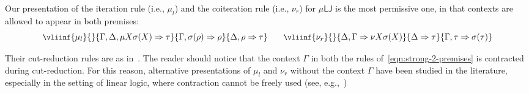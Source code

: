 \documentclass[10pt,a4paper]{amsart}
\theoremstyle{plain}
\theoremstyle{definition}
\newcommand{\dfn}{:=}
\theoremstyle{plain}
\theoremstyle{definition} %
\newcommand{\nat}{\mathit{N}}
\newcommand{\N}{\nat} %
\newcommand{\unit}{1}
\newcommand{\seqar}{\Rightarrow}
\newcommand{\lr}[1]{#1_l}
\newcommand{\rr}[1]{#1_r}
\newcommand{\LJ}{\mathsf{LJ}}
\newcommand{\muLJ}{\mu\LJ}
\newcommand{\circular}{\mathsf C}
\newcommand{\cmuLJ}{\circular\muLJ}
\begin{document}






Our presentation of the iteration rule (i.e., $\lr\mu$)  and the coiteration rule (i.e., $\rr \nu$) for $\muLJ$ is the most permissive one, in that contexts are allowed to appear in both premises:
 \begin{equation}\label{eqn:strong-2-premises}
      \small
    \vliinf{\lr \mu}{}{\Gamma,\Delta, \mu X \sigma(X)  \seqar \tau}{\Gamma, \sigma(\rho)\seqar \rho}{\Delta, \rho \seqar \tau}
  \qquad
   \vliinf{\rr \nu }{}{ \Delta, \Gamma  \seqar \nu X\sigma(X)}{\Delta \seqar  \tau }{  \Gamma, \tau \seqar \sigma(\tau)}
 \end{equation}

 
 Their cut-reduction rules are as in~. The reader should notice that the context $\Gamma$ in both the rules of~\eqref{eqn:strong-2-premises} is contracted during cut-reduction. For this reason, alternative presentations of $\lr\mu $ and $\rr \nu$ without  the context $\Gamma$ have been studied in the literature, especially in the setting of linear logic, where contraction cannot be freely used (see, e.g.,~\cite{BaeldeMiller07})
 
\end{document}
